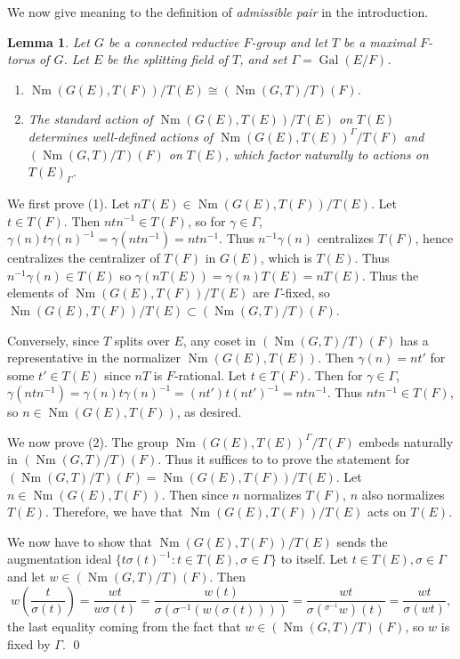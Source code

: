 \documentclass[11pt]{amsart}
\theoremstyle{plain}
\newtheorem{lemma}[theorem]{Lemma}
\theoremstyle{definition}
\DeclareMathOperator{\Gal}{Gal}
\DeclareMathOperator{\Nm}{Nm}
\begin{document}
We now give meaning to the definition of \emph{admissible pair} in the introduction.

\begin{lemma}\label{weylgroups}
Let $G$ be a connected reductive $F$-group and let $T$ be a maximal
$F$-torus of $G$.  Let $E$ be the splitting field of $T$, and set
$\Gamma = \Gal(E/F)$.
\begin{enumerate}
\item $\Nm(G(E), T(F)) / T(E) \cong (\Nm(G,T)/T)(F)$.
\item The standard action of $\Nm(G(E),T(E)) / T(E)$ on $T(E)$ determines
well-defined actions of $\Nm(G(E), T(E))^{\Gamma} / T(F)$ and $(\Nm(G,T)/T)(F)$
on $T(E)$, which factor naturally to actions on $T(E)_{\Gamma}$.
\end{enumerate}
\end{lemma}

\proof
We first prove (1).  Let $nT(E)\in \Nm(G(E), T(F)) / T(E)$.  Let $t\in T(F)$.
Then $ntn^{-1}\in T(F)$, so for $\gamma\in\Gamma$,
$\gamma(n)t\gamma(n)^{-1} =  \gamma (ntn^{-1}) = ntn^{-1}$.
Thus $n^{-1}\gamma(n)$ centralizes $T(F)$, hence centralizes the centralizer
of $T(F)$ in $G(E)$, which is $T(E)$. Thus $n^{-1}\gamma(n)\in T(E)$ so
$\gamma(n T(E)) = \gamma (n) T(E) = n T(E)$. Thus the elements of
$\Nm(G(E), T(F)) / T(E)$ are $\Gamma$-fixed, so
$\Nm(G(E), T(F)) / T(E) \subset (\Nm(G,T)/T)(F)$.

Conversely, since $T$ splits over $E$, any coset in $(\Nm(G,T)/T)(F)$
has a representative in the normalizer $\Nm(G(E), T(E))$. Then $\gamma(n) = nt'$
for some $t'\in T(E)$ since $nT$ is $F$-rational.  Let $t\in T(F)$.
Then for $\gamma\in\Gamma$,
$\gamma(ntn^{-1}) = \gamma(n) t \gamma(n)^{-1} = (nt')t(nt')^{-1} = ntn^{-1}$.
Thus $ntn^{-1}\in T(F)$, so $n\in \Nm(G(E),T(F))$, as desired.

We now prove (2).
The group $\Nm(G(E), T(E))^{\Gamma} / T(F)$ embeds naturally in $(\Nm(G,T)/T)(F)$.
Thus it suffices to to prove the statement for
$(\Nm(G,T)/T)(F) = \Nm(G(E), T(F)) / T(E)$.  Let $n \in \Nm(G(E),T(F))$.  Then since $n$
normalizes $T(F)$, $n$ also normalizes $T(E)$.  Therefore, we have that
$\Nm(G(E), T(F)) / T(E)$ acts on $T(E)$.

We now have to show that $\Nm(G(E), T(F)) / T(E)$
sends the augmentation ideal
$\{ t\sigma(t)^{-1} : t \in T(E), \sigma \in \Gamma \}$ to itself.
Let $t \in T(E), \sigma \in \Gamma$ and let $w \in  (\Nm(G,T)/T)(F)$.  Then $$w\left(\frac{t}{\sigma(t)}\right)
= \frac{wt}{w \sigma(t)} = \frac{w(t)}{\sigma (\sigma^{-1}(w(\sigma(t))))} =
\frac{wt}{\sigma ({}^{\sigma^{-1}} w) (t)} = \frac{wt}{\sigma(wt)},$$
the last equality coming from the fact that $w \in (\Nm(G,T)/T)(F)$, so $w$
is fixed by $\Gamma$.
\qed
\end{document}
